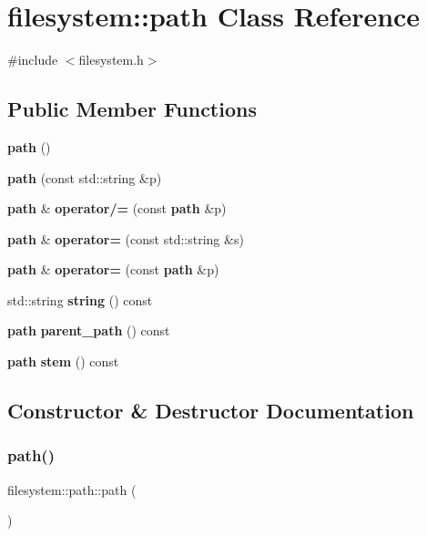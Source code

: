 \section{filesystem\+::path Class Reference}
\label{classfilesystem_1_1path}


{\ttfamily \#include $<$filesystem.\+h$>$}

\subsection*{Public Member Functions}
\begin{DoxyCompactItemize}
\item 
\textbf{ path} ()
\item 
\textbf{ path} (const std\+::string \&p)
\item 
\textbf{ path} \& \textbf{ operator/=} (const \textbf{ path} \&p)
\item 
\textbf{ path} \& \textbf{ operator=} (const std\+::string \&s)
\item 
\textbf{ path} \& \textbf{ operator=} (const \textbf{ path} \&p)
\item 
std\+::string \textbf{ string} () const
\item 
\textbf{ path} \textbf{ parent\+\_\+path} () const
\item 
\textbf{ path} \textbf{ stem} () const
\end{DoxyCompactItemize}


\subsection{Constructor \& Destructor Documentation}
\mbox{\label{classfilesystem_1_1path_a6a63fbe8382534719d1e8a3bf3476ae2}} 
\subsubsection{path()\hspace{0.1cm}{\footnotesize\ttfamily [1/2]}}
{\footnotesize\ttfamily filesystem\+::path\+::path (\begin{DoxyParamCaption}{ }\end{DoxyParamCaption})\hspace{0.3cm}{\ttfamily [inline]}}

\mbox{\label{classfilesystem_1_1path_a86db96d2f27e594284a200fa6a0d2c4b}} 
